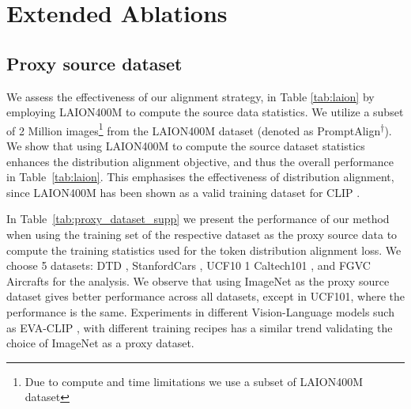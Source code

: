   


\section{Extended Ablations}
\label{supp:ablations}

\subsection{Proxy source dataset}
\label{supp:laion_ablation}
We assess the effectiveness of our alignment strategy, in Table \ref{tab:laion} by employing LAION400M \cite{schuhmann2021laion} to compute the source data statistics. We utilize a subset of 2 Million images\footnote[1]{Due to compute and time limitations we use a subset of LAION400M dataset} from the LAION400M dataset (denoted as PromptAlign\textsuperscript{$\dagger$}). We show that using LAION400M to compute the source dataset statistics enhances the distribution alignment objective, and thus the overall performance in Table~\ref{tab:laion}. This emphasises the effectiveness of distribution alignment, since LAION400M has been shown as a valid training dataset for CLIP \cite{cherti2022reproducible}.

In Table~\ref{tab:proxy_dataset_supp} we present the performance of our method when using the training set of the respective dataset as the proxy source data to compute the training statistics used for the token distribution alignment loss. We choose 5 datasets: DTD \cite{cimpoi2014describing}, StanfordCars \cite{krause20133d}, UCF10 1\cite{soomro2012dataset} Caltech101 \cite{fei2004learning}, and FGVC Aircrafts \cite{maji2013fine} for the analysis. We observe that using ImageNet as the proxy source dataset gives better performance across all datasets, except in UCF101, where the performance is the same. Experiments in different Vision-Language models such as EVA-CLIP \cite{fang2023eva}, with different training recipes has a similar trend validating the choice of ImageNet as a proxy dataset.

